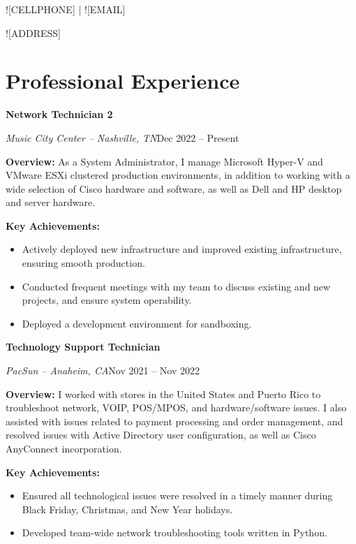 \documentclass[a4paper]{article}
\renewcommand{\maketitle}{
    \begin{center}
        \color{white}
        {\huge\bfseries\theauthor}
        \vspace{.5em}

        \textsf{![CELLPHONE] | ![EMAIL]}\par
        \textsf{![ADDRESS]}

    \end{center}
}
\begin{document}
%

\author{\textsf{![FIRSTNAME] ![LASTNAME]}}
\maketitle

\section{Professional Experience}
\begin{minipage}{\textwidth}
\textbf{Network Technician 2}\par
\textit{Music City Center -- Nashville, TN}\hfill Dec 2022 -- Present

\medskip
\textbf{Overview:} As a System Administrator, I manage Microsoft Hyper-V and VMware ESXi clustered production environments, in addition to working with a wide selection of Cisco hardware and software, as well as Dell and HP desktop and server hardware.

\medskip
\textbf{Key Achievements:} 
\begin{itemize}
    \item Actively deployed new infrastructure and improved existing infrastructure, ensuring smooth production.
    \item Conducted frequent meetings with my team to discuss existing and new projects, and ensure system operability.
    \item Deployed a development environment for sandboxing.
\end{itemize}
\end{minipage}

\vspace{10pt}
\begin{minipage}{\textwidth}
\textbf{Technology Support Technician}\par
\textit{PacSun -- Anaheim, CA}\hfill Nov 2021 -- Nov 2022

\medskip
\textbf{Overview:} I worked with stores in the United States and Puerto Rico to troubleshoot network, VOIP, POS/MPOS, and hardware/software issues. I also assisted with issues related to payment processing and order management, and resolved issues with Active Directory user configuration, as well as Cisco AnyConnect incorporation.

\medskip
\textbf{Key Achievements:}
\begin{itemize}
    \item Ensured all technological issues were resolved in a timely manner during Black Friday, Christmas, and New Year holidays.
    \item Developed team-wide network troubleshooting tools written in Python.
\end{itemize}
\end{minipage}
\end{document}
